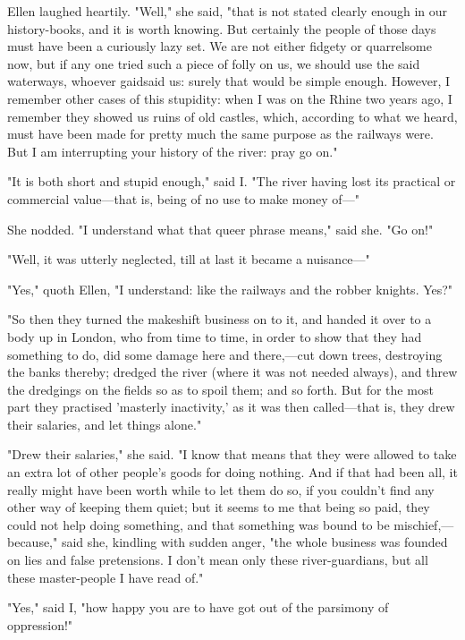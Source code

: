 Ellen laughed heartily. "Well," she said, "that is not stated clearly
enough in our history-books, and it is worth knowing. But certainly the
people of those days must have been a curiously lazy set. We are not
either fidgety or quarrelsome now, but if any one tried such a piece of
folly on us, we should use the said waterways, whoever gaidsaid us:
surely that would be simple enough. However, I remember other cases of
this stupidity: when I was on the Rhine two years ago, I remember they
showed us ruins of old castles, which, according to what we heard, must
have been made for pretty much the same purpose as the railways were.
But I am interrupting your history of the river: pray go on."

"It is both short and stupid enough," said I. "The river having lost its
practical or commercial value---that is, being of no use to make money
of---"

She nodded. "I understand what that queer phrase means," said she. "Go
on!"

"Well, it was utterly neglected, till at last it became a nuisance---"

"Yes," quoth Ellen, "I understand: like the railways and the robber
knights. Yes?"

"So then they turned the makeshift business on to it, and handed it over
to a body up in London, who from time to time, in order to show that
they had something to do, did some damage here and there,---cut down
trees, destroying the banks thereby; dredged the river (where it was not
needed always), and threw the dredgings on the fields so as to spoil
them; and so forth. But for the most part they practised 'masterly
inactivity,' as it was then called---that is, they drew their salaries,
and let things alone."

"Drew their salaries," she said. "I know that means that they were
allowed to take an extra lot of other people's goods for doing nothing.
And if that had been all, it really might have been worth while to let
them do so, if you couldn't find any other way of keeping them quiet;
but it seems to me that being so paid, they could not help doing
something, and that something was bound to be mischief,---because," said
she, kindling with sudden anger, "the whole business was founded on lies
and false pretensions. I don't mean only these river-guardians, but all
these master-people I have read of."

"Yes," said I, "how happy you are to have got out of the parsimony of
oppression!"

